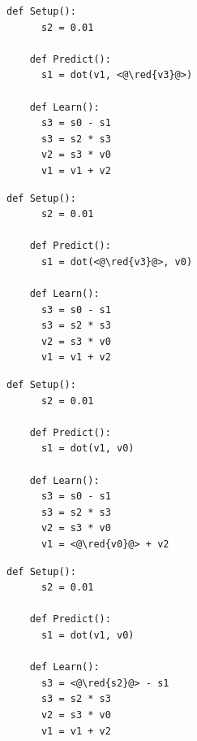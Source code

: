 \documentclass[11pt,oneside,openany,report]{jsbook}
\newcommand{\red}[1]{\textcolor{red}{#1}}
\begin{document}
\begin{multicols}{2}
  \begin{lstlisting}[caption=妥当なアルゴリズムの条件2の(a)を満たさない非妥当なアルゴリズム,label=code:invalid_algorithm_2]
    def Setup():
      s2 = 0.01

    def Predict():
      s1 = dot(v1, <@\red{v3}@>)

    def Learn():
      s3 = s0 - s1
      s3 = s2 * s3
      v2 = s3 * v0
      v1 = v1 + v2
  \end{lstlisting}

  \columnbreak

  \begin{lstlisting}[caption=妥当なアルゴリズムの条件2の(b)を満たさない非妥当なアルゴリズム,label=code:invalid_algorithm_3]
    def Setup():
      s2 = 0.01

    def Predict():
      s1 = dot(<@\red{v3}@>, v0)

    def Learn():
      s3 = s0 - s1
      s3 = s2 * s3
      v2 = s3 * v0
      v1 = v1 + v2
  \end{lstlisting}
\end{multicols}

\begin{multicols}{2}
  \begin{lstlisting}[caption=妥当なアルゴリズムの条件1の(a)を満たさない非妥当なアルゴリズム,label=code:invalid_algorithm_4]
    def Setup():
      s2 = 0.01

    def Predict():
      s1 = dot(v1, v0)

    def Learn():
      s3 = s0 - s1
      s3 = s2 * s3
      v2 = s3 * v0
      v1 = <@\red{v0}@> + v2
  \end{lstlisting}

  \columnbreak

  \begin{lstlisting}[caption=妥当なアルゴリズムの条件1の(b)を満たさない非妥当なアルゴリズム,label=code:invalid_algorithm_5]
    def Setup():
      s2 = 0.01

    def Predict():
      s1 = dot(v1, v0)

    def Learn():
      s3 = <@\red{s2}@> - s1
      s3 = s2 * s3
      v2 = s3 * v0
      v1 = v1 + v2
  \end{lstlisting}
\end{multicols}

\newpage
\end{document}
